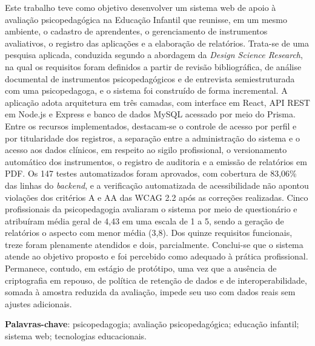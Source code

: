 \setlength{\absparsep}{18pt}

\begin{resumo}

Este trabalho teve como objetivo desenvolver um sistema web de apoio à avaliação psicopedagógica na Educação Infantil que reunisse, em um mesmo ambiente, o cadastro de aprendentes, o gerenciamento de instrumentos avaliativos, o registro das aplicações e a elaboração de relatórios. Trata-se de uma pesquisa aplicada, conduzida segundo a abordagem da \textit{Design Science Research}, na qual os requisitos foram definidos a partir de revisão bibliográfica, de análise documental de instrumentos psicopedagógicos e de entrevista semiestruturada com uma psicopedagoga, e o sistema foi construído de forma incremental. A aplicação adota arquitetura em três camadas, com interface em React, API REST em Node.js e Express e banco de dados MySQL acessado por meio do Prisma. Entre os recursos implementados, destacam-se o controle de acesso por perfil e por titularidade dos registros, a separação entre a administração do sistema e o acesso aos dados clínicos, em respeito ao sigilo profissional, o versionamento automático dos instrumentos, o registro de auditoria e a emissão de relatórios em PDF. Os 147 testes automatizados foram aprovados, com cobertura de 83,06\% das linhas do \textit{backend}, e a verificação automatizada de acessibilidade não apontou violações dos critérios A e AA das WCAG 2.2 após as correções realizadas. Cinco profissionais da psicopedagogia avaliaram o sistema por meio de questionário e atribuíram média geral de 4,43 em uma escala de 1 a 5, sendo a geração de relatórios o aspecto com menor média (3,8). Dos quinze requisitos funcionais, treze foram plenamente atendidos e dois, parcialmente. Conclui-se que o sistema atende ao objetivo proposto e foi percebido como adequado à prática profissional. Permanece, contudo, em estágio de protótipo, uma vez que a ausência de criptografia em repouso, de política de retenção de dados e de interoperabilidade, somada à amostra reduzida da avaliação, impede seu uso com dados reais sem ajustes adicionais.

\noindent
\textbf{Palavras-chave}: psicopedagogia; avaliação psicopedagógica; educação infantil; sistema web; tecnologias educacionais.

\end{resumo}